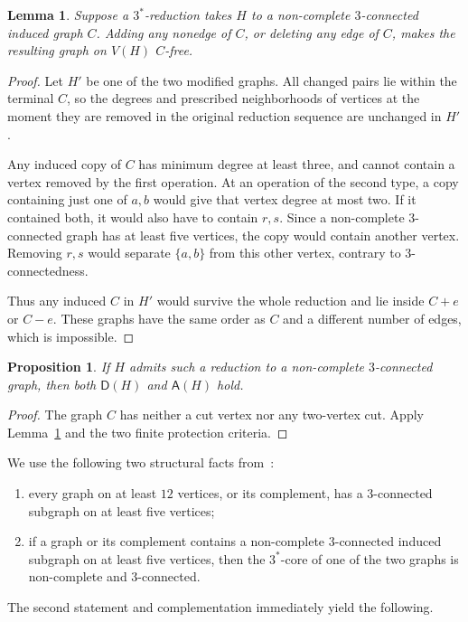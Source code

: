 \documentclass[11pt,reqno]{amsart}
\newtheorem{lemma}[theorem]{Lemma}
\newtheorem{proposition}[theorem]{Proposition}
\theoremstyle{definition}
\theoremstyle{remark}
\newcommand{\Dsat}{\mathsf{D}}
\newcommand{\Asat}{\mathsf{A}}
\begin{document}
\begin{lemma}\label{lem:core-destruction}
Suppose a $3^{*}$-reduction takes $H$ to a non-complete $3$-connected induced graph $C$. Adding any nonedge of $C$, or deleting any edge of $C$, makes the resulting graph on $V(H)$ $C$-free.
\end{lemma}
\begin{proof}
Let $H'$ be one of the two modified graphs. All changed pairs lie within the terminal $C$, so the degrees and prescribed neighborhoods of vertices at the moment they are removed in the original reduction sequence are unchanged in $H'$.

Any induced copy of $C$ has minimum degree at least three, and cannot contain a vertex removed by the first operation. At an operation of the second type, a copy containing just one of $a,b$ would give that vertex degree at most two. If it contained both, it would also have to contain $r,s$. Since a non-complete $3$-connected graph has at least five vertices, the copy would contain another vertex. Removing $r,s$ would separate $\{a,b\}$ from this other vertex, contrary to $3$-connectedness.

Thus any induced $C$ in $H'$ would survive the whole reduction and lie inside $C+e$ or $C-e$. These graphs have the same order as $C$ and a different number of edges, which is impossible.
\end{proof}

\begin{proposition}\label{prop:core-hosts}
If $H$ admits such a reduction to a non-complete $3$-connected graph, then both $\Dsat(H)$ and $\Asat(H)$ hold.
\end{proposition}
\begin{proof}
The graph $C$ has neither a cut vertex nor any two-vertex cut. Apply Lemma~\ref{lem:core-destruction} and the two finite protection criteria.
\end{proof}

We use the following two structural facts from~\cite[Lemmas~12--13]{BGJMS}:
\begin{enumerate}
\item every graph on at least $12$ vertices, or its complement, has a $3$-connected subgraph on at least five vertices;
\item if a graph or its complement contains a non-complete $3$-connected induced subgraph on at least five vertices, then the $3^{*}$-core of one of the two graphs is non-complete and $3$-connected.
\end{enumerate}
The second statement and complementation immediately yield the following.
\end{document}
